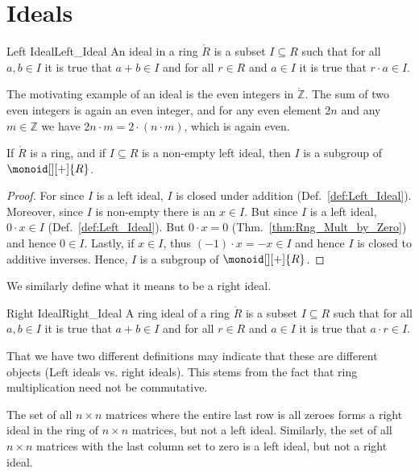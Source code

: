 \section{Ideals}
    \begin{fdefinition}{Left Ideal}{Left_Ideal}
        An ideal in a ring $\ring{R}$ is a subset $I\subseteq{R}$ such that
        for all $a,b\in{I}$ it is true that $a+b\in{I}$ and for all
        $r\in{R}$ and $a\in{I}$ it is true that $r\cdot{a}\in{I}$.
    \end{fdefinition}
    \begin{example}
        The motivating example of an ideal is the even integers
        in $\ring{\mathbb{Z}}$. The sum of two even integers is again an
        even integer, and for any even element $2n$ and any $m\in\mathbb{Z}$
        we have $2n\cdot{m}=2\cdot(n\cdot{m})$, which is again even.
    \end{example}
    \begin{theorem}
        \label{thm:Left_Ideal_is_Additive_Subgroup}%
        If $\ring{R}$ is a ring, and if $I\subseteq{R}$ is a non-empty left
        ideal, then $I$ is a subgroup of $\monoid[][+]{R}$.
    \end{theorem}
    \begin{proof}
        For since $I$ is a left ideal, $I$ is closed under addition
        (Def.~\ref{def:Left_Ideal}). Moreover, since $I$ is non-empty there
        is an $x\in{I}$. But since $I$ is a left ideal, $0\cdot{x}\in{I}$
        (Def.~\ref{def:Left_Ideal}). But $0\cdot{x}=0$
        (Thm.~\ref{thm:Rng_Mult_by_Zero}) and hence $0\in{I}$. Lastly, if
        $x\in{I}$, thus $(\minus{1})\cdot{x}=\minus{x}\in{I}$ and hence
        $I$ is closed to additive inverses. Hence, $I$ is a subgroup of
        $\monoid[][+]{R}$.
    \end{proof}
    We similarly define what it means to be a right ideal.
    \begin{fdefinition}{Right Ideal}{Right_Ideal}
        A ring ideal of a ring $\ring{R}$ is a subset $I\subseteq{R}$ such
        that for all $a,b\in{I}$ it is true that $a+b\in{I}$ and for all
        $r\in{R}$ and $a\in{I}$ it is true that $a\cdot{r}\in{I}$.
    \end{fdefinition}
    That we have two different definitions may indicate that these are
    different objects (Left ideals vs. right ideals). This stems from the
    fact that ring multiplication need not be commutative.
    \begin{example}
        The set of all $n\times{n}$ matrices where the entire last row is
        all zeroes forms a right ideal in the ring of $n\times{n}$ matrices,
        but not a left ideal. Similarly, the set of all $n\times{n}$
        matrices with the last column set to zero is a left ideal, but not a
        right ideal.
    \end{example}
